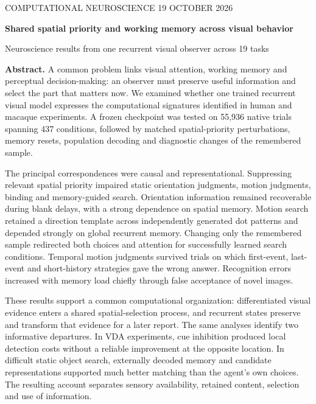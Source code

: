 \documentclass[11pt,letterpaper]{article}
\begin{document}
\thispagestyle{empty}
{\small\textcolor{ink}{COMPUTATIONAL NEUROSCIENCE \hfill 19 OCTOBER 2026}\par}
\vspace{0.35in}
{\LARGE\bfseries Shared spatial priority and working memory across visual behavior\par}
\vspace{0.12in}
{\large Neuroscience results from one recurrent visual observer across 19 tasks\par}
\vspace{0.18in}
\textbf{Abstract.} A common problem links visual attention, working memory and perceptual decision-making: an observer must preserve useful information and select the part that matters now. We examined whether one trained recurrent visual model expresses the computational signatures identified in human and macaque experiments. A frozen checkpoint was tested on 55,936 native trials spanning 437 conditions, followed by matched spatial-priority perturbations, memory resets, population decoding and diagnostic changes of the remembered sample.

The principal correspondences were causal and representational. Suppressing relevant spatial priority impaired static orientation judgments, motion judgments, binding and memory-guided search. Orientation information remained recoverable during blank delays, with a strong dependence on spatial memory. Motion search retained a direction template across independently generated dot patterns and depended strongly on global recurrent memory. Changing only the remembered sample redirected both choices and attention for successfully learned search conditions. Temporal motion judgments survived trials on which first-event, last-event and short-history strategies gave the wrong answer. Recognition errors increased with memory load chiefly through false acceptance of novel images.

These results support a common computational organization: differentiated visual evidence enters a shared spatial-selection process, and recurrent states preserve and transform that evidence for a later report. The same analyses identify two informative departures. In VDA experiments, cue inhibition produced local detection costs without a reliable improvement at the opposite location. In difficult static object search, externally decoded memory and candidate representations supported much better matching than the agent's own choices. The resulting account separates sensory availability, retained content, selection and use of information.
\end{document}
